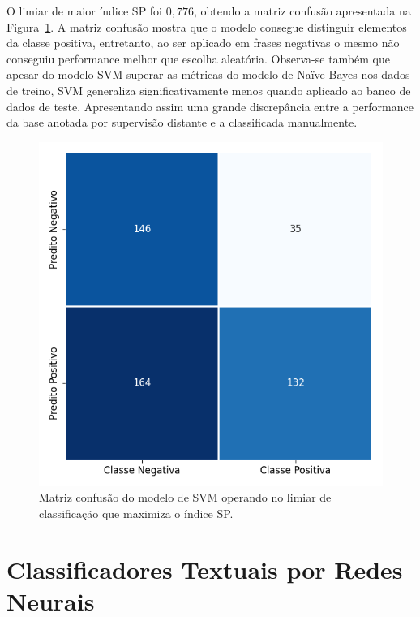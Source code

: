 O limiar de maior índice SP foi $0,776$, obtendo a matriz confusão
apresentada na Figura~\ref{fig:svm_confusion}.
A matriz confusão mostra que o modelo consegue distinguir elementos da classe
positiva, entretanto, ao ser aplicado em frases negativas o mesmo não conseguiu
performance melhor que escolha aleatória.
Observa-se também que apesar do modelo SVM superar as métricas do modelo de
Naïve Bayes nos dados de treino, SVM generaliza significativamente menos quando
aplicado ao banco de dados de teste.
Apresentando assim uma grande discrepância entre a performance da base anotada
por supervisão distante e a classificada manualmente.

\begin{figure}[h!]
\begin{center} {
    \begin{center}
    \includegraphics[scale=0.65]{images/svm_cm.png}
    \caption{Matriz confusão do modelo de SVM operando no limiar de classificação que maximiza o índice SP.}
    \label{fig:svm_confusion}
    \end{center}
}
\end{center}
\end{figure}


\section{Classificadores Textuais por Redes Neurais}

